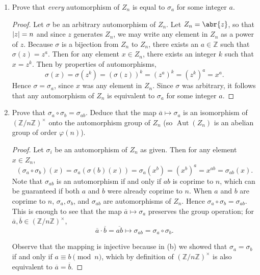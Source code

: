 \documentclass[11pt]{article}
\DeclareMathOperator\Aut{Aut}
\begin{document}
\begin{enumerate}
\begin{enumerate}[label=(\alph*)]
\begin{proof}
        Conversely, suppose $\sigma_a = \sigma_b$, so that for any $x\in Z_n$, $\sigma_a(x) = x^a = x^b = \sigma_b(x)$. Then $1 = x^bx^{-a} = x^{b-a}$, which implies that $n\mid b-a$, which by definition is equivalent to $b\equiv a \pmod{n}$, since there exists an integer $k$ such that $b - a= nk \iff b = a+nk$.
      \end{proof}
      \item Prove that \textit{every} automorphism of $Z_n$ is equal to $\sigma_a$ for some integer $a$. \begin{proof}
        Let $\sigma$ be an arbitrary automorphism of $Z_n$. Let $Z_n = \abr{z}$, so that $\abs{z} = n$ and since $z$ generates $Z_n$, we may write any element in $Z_n$ as a power of $z$. Because $\sigma$ is a bijection from $Z_n$ to $Z_n$, there exists an $a\in \mathbb{Z}$ such that $\sigma(z) = z^a$. Then for any element $x\in Z_n$, there exists an integer $k$ such that $x = z^k$. Then by properties of automorphisms, \[\sigma(x) = \sigma(z^k) = (\sigma(z))^k = (z^a)^k = (z^k)^a = x^a.\] Hence $\sigma = \sigma_a$, since $x$ was any element in $Z_n$. Since $\sigma$ was arbitrary, it follows that any automorphism of $Z_n$ is equivalent to $\sigma_a$ for some integer $a$.
      \end{proof}
      \item Prove that $\sigma_a\circ \sigma_b = \sigma_{ab}$. Deduce that the map $\overline{a}\mapsto \sigma_a$ is an isomorphism of $(\mathbb{Z}/n\mathbb{Z})^{\times}$ onto the automorphism group of $Z_n$ (so $\Aut(Z_n)$ is an abelian group of order $\varphi(n)$). \begin{proof}
        Let $\sigma_i$ be an automorphism of $Z_n$ as given. Then for any element $x\in Z_n$, \[(\sigma_a\circ \sigma_b)(x) = \sigma_a(\sigma(b)(x)) = \sigma_a(x^b) = (x^b)^a = x^{ab} = \sigma_{ab}(x).\] Note that $\sigma_{ab}$ is an automorphism if and only if $ab$ is coprime to $n$, which can be guaranteed if both $a$ and $b$ were already coprime to $n$. When $a$ and $b$ are coprime to $n$, $\sigma_a,\sigma_b$, and $\sigma_{ab}$ are automorphisms of $Z_n$. Hence $\sigma_a\circ \sigma_b = \sigma_{ab}$. This is enough to see that the map $\overline{a}\mapsto \sigma_a$ preserves the group operation; for $\overline{a}, \overline{b}\in (\mathbb{Z}/n\mathbb{Z})^{\times}$, \[\overline{a}\cdot \overline{b} = \overline{ab}\mapsto \sigma_{ab} = \sigma_a\circ \sigma_b.\] 

        Observe that the mapping is injective because in (b) we showed that $\sigma_a = \sigma_b$ if and only if $a\equiv b \pmod{n}$, which by definition of $(\mathbb{Z}/n\mathbb{Z})^{\times}$ is also equivalent to $\overline{a} = \overline{b}$. 
        

\end{proof}
\end{enumerate}
\end{enumerate}
\end{document}
